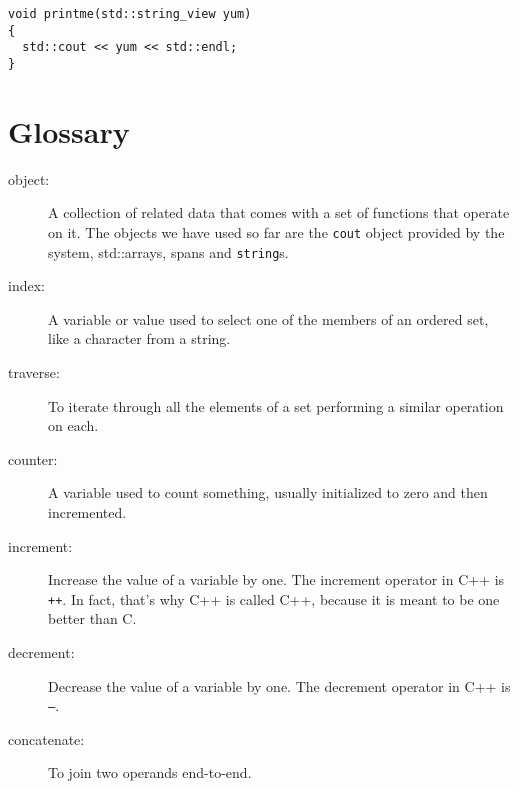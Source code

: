 \begin{verbatim}
void printme(std::string_view yum)
{
  std::cout << yum << std::endl;
}

\end{verbatim}
\section{Glossary}

\begin{description}

\item[object:] A collection of related data that comes with a set of
functions that operate on it.  The objects we have used so far are the
{\tt cout} object provided by the system, std::arrays, spans and {\tt string}s.

\item[index:]  A variable or value used to select one of the
members of an ordered set, like a character from a string.

\item[traverse:]  To iterate through all the elements of a set
performing a similar operation on each.

\item[counter:]  A variable used to count something, usually
initialized to zero and then incremented.

\item[increment:]  Increase the value of a variable by one.
The increment operator in C++ is {\tt ++}.  In fact, that's
why C++ is called C++, because it is meant to be one better
than C.

\item[decrement:]  Decrease the value of a variable by one.
The decrement operator in C++ is {\tt --}.

\item[concatenate:] To join two operands end-to-end.


\end{description}
